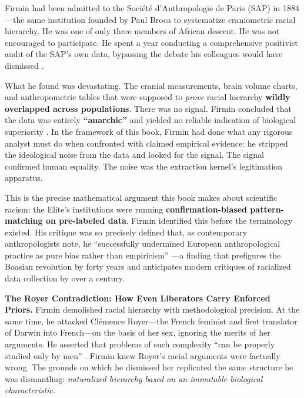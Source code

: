 Firmin had been admitted to the Société d'Anthropologie de Paris (SAP) in 1884---the same institution founded by Paul Broca to systematize craniometric racial hierarchy. He was one of only three members of African descent. He was not encouraged to participate. He spent a year conducting a comprehensive positivist audit of the SAP's own data, bypassing the debate his colleagues would have dismissed \cite{firmin_legacy, drouinhans}.

What he found was devastating. The cranial measurements, brain volume charts, and anthropometric tables that were supposed to \textit{prove} racial hierarchy \textbf{wildly overlapped across populations}. There was no signal. Firmin concluded that the data was entirely \textbf{``anarchic''} and yielded no reliable indication of biological superiority \cite{firmin_legacy}. In the framework of this book, Firmin had done what any rigorous analyst must do when confronted with claimed empirical evidence: he stripped the ideological noise from the data and looked for the signal. The signal confirmed human equality. The noise was the extraction kernel's legitimation apparatus.

This is the precise mathematical argument this book makes about scientific racism: the Elite's institutions were running \textbf{confirmation-biased pattern-matching on pre-labeled data}. Firmin identified this before the terminology existed. His critique was so precisely defined that, as contemporary anthropologists note, he ``successfully undermined European anthropological practice as pure bias rather than empiricism'' \cite{firmin_legacy}---a finding that prefigures the Boasian revolution by forty years and anticipates modern critiques of racialized data collection by over a century.

\textbf{The Royer Contradiction: How Even Liberators Carry Enforced Priors.} Firmin demolished racial hierarchy with methodological precision. At the same time, he attacked Clémence Royer---the French feminist and first translator of Darwin into French---on the basis of her sex, ignoring the merits of her arguments. He asserted that problems of such complexity ``can be properly studied only by men'' \cite{drouinhans}. Firmin knew Royer's racial arguments were factually wrong. The grounds on which he dismissed her replicated the same structure he was dismantling: \textit{naturalized hierarchy based on an immutable biological characteristic}.

